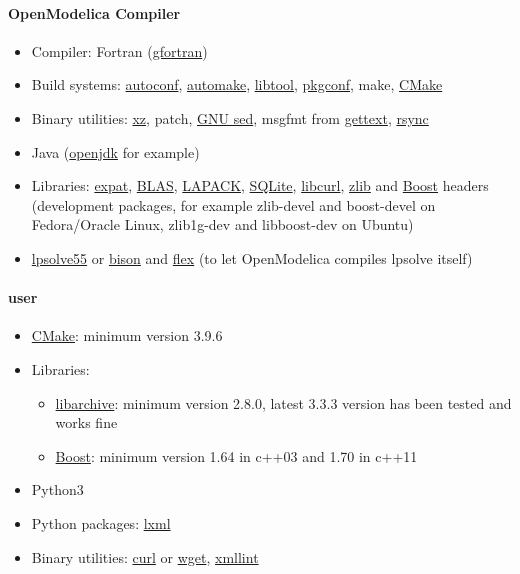 \documentclass[a4paper, 12pt]{report}
\begin{document}
\paragraph{OpenModelica Compiler}

\begin{itemize}
\item
  Compiler: Fortran (\href{https://gcc.gnu.org/fortran/}{gfortran})
\item
  Build systems:
  \href{https://www.gnu.org/software/autoconf/}{autoconf},
  \href{https://www.gnu.org/software/autoconf/}{automake},
  \href{https://www.gnu.org/software/libtool/}{libtool},
  \href{http://pkgconf.org/}{pkgconf}, make,
  \href{https://cmake.org/}{CMake}
\item
  Binary utilities: \href{https://tukaani.org/xz/}{xz}, patch,
  \href{https://www.gnu.org/software/sed/}{GNU sed}, msgfmt from
  \href{https://www.gnu.org/software/gettext/}{gettext},
  \href{https://rsync.samba.org/}{rsync}
\item
  Java (\href{https://openjdk.java.net/}{openjdk} for example)
\item
  Libraries: \href{https://libexpat.github.io/}{expat},
  \href{http://www.netlib.org/blas/index.html}{BLAS},
  \href{http://www.netlib.org/lapack/index.html}{LAPACK},
  \href{https://www.sqlite.org/}{SQLite},
  \href{https://curl.se/libcurl/}{libcurl},
  \href{https://zlib.net/}{zlib} and
  \href{https://www.boost.org/}{Boost} headers (development packages,
  for example zlib-devel and boost-devel on Fedora/Oracle Linux,
  zlib1g-dev and libboost-dev on Ubuntu)
\item
  \href{http://lpsolve.sourceforge.net/}{lpsolve55} or
  \href{https://www.gnu.org/software/bison/}{bison} and
  \href{https://www.gnu.org/software/flex/}{flex} (to let OpenModelica
  compiles lpsolve itself)
\end{itemize}

\paragraph{\Dynawo user}

\begin{itemize}
\item
  \href{https://cmake.org/}{CMake}: minimum version 3.9.6
\item
  Libraries:

  \begin{itemize}
  \item
    \href{https://www.libarchive.org/}{libarchive}: minimum version
    2.8.0, latest 3.3.3 version has been tested and works fine
  \item
    \href{https://www.boost.org/}{Boost}: minimum version 1.64 in c++03 and 1.70 in c++11
  \end{itemize}

\item
  Python3
\item
  Python packages: \href{https://lxml.de/}{lxml}
\item
  Binary utilities: \href{https://curl.haxx.se/}{curl} or
  \href{https://www.gnu.org/software/wget/}{wget},
  \href{http://xmlsoft.org/xmllint.html}{xmllint}
\end{itemize}
\end{document}
